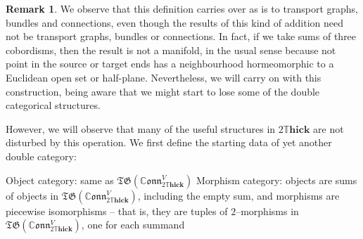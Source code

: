 \documentclass{amsart}
\newcommand{\br}[1]{\left( #1 \right)}
\newcommand{\DThick}{2\mathbb{T}\mathbf{hick}}
\newcommand{\TG}{\mathfrak{TG}}
\newcommand{\CConn}{\mathbb{C}\mathfrak{onn}}
\newcommand{\li}[1][]{\ifthenelse{\equal{#1}{}}{\item}{\item \label{#1}}}
\newenvironment{enmrt}{
  \enumerate[(i)]
  \setlength{\itemsep}{0pt}
}{
  \endenumerate
}
\numberwithin{thm}{section}
\theoremstyle{definition}
\newtheorem{rmk}[thm]{Remark}
\begin{document}
\begin{rmk}
We observe that this definition carries over as is to transport graphs, bundles
and connections, even though the results of this kind of addition need not be
transport graphs, bundles or connections. In fact, if we take sums of three
cobordisms, then the result is not a manifold, in the usual sense because not
point in the source or target ends has a neighbourhood hormeomorphic to a
Euclidean open set or half-plane. Nevertheless, we will carry on with this
construction, being aware that we might start to lose some of the double
categorical structures.
\end{rmk}

However, we will observe that many of the useful structures in $\DThick$ are not
disturbed by this operation. We first define the starting data of yet another
double category:

\begin{enmrt}
\li Object category: same as $\TG\br{\CConn^V_{\DThick}}$
\li Morphism category: objects are sums of objects in
$\TG\br{\CConn^V_{\DThick}}$, including the empty sum, and morphisms are
piecewise isomorphisms -- that is, they are tuples of $2$--morphisms in
$\TG\br{\CConn^V_{\DThick}}$, one for each summand
\end{enmrt}
\end{document}
